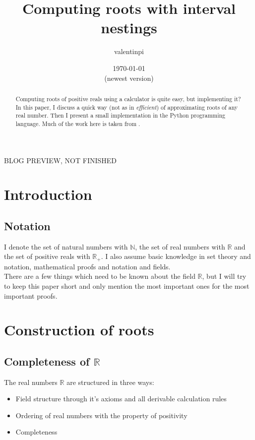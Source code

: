 \documentclass[a4paper, 10pt]{article}
\theoremstyle{remark}
\theoremstyle{definition}
\begin{document}
    \title{
        \vspace{-5ex}
        \large Computing roots with interval nestings
    }
    \author{
        \normalsize valentinpi
    }
    \date{
        \normalsize \today\\
        (newest version)
    }
    \maketitle

    \begin{abstract}
        Computing roots of positive reals using a calculator is quite easy, but implementing it? In this paper, I discuss a quick way (not as in \emph{efficient}) of approximating roots of any real number. Then I present a small implementation in the Python programming language. Much of the work here is taken from \cite{analysiskoenigsberger}.
    \end{abstract}

    \begin{center}
        \huge
        BLOG PREVIEW, NOT FINISHED
    \end{center}
    
    \tableofcontents

    \section{Introduction}
    
    \subsection{Notation}
    
    I denote the set of natural numbers with \(\mathbb{N}\), the set of real numbers with \(\mathbb{R}\) and the set of positive reals with \(\mathbb{R}_+\). I also assume basic knowledge in set theory and notation, mathematical proofs and notation and fields.\\

    There are a few things which need to be known about the field \(\mathbb{R}\), but I will try to keep this paper short and only mention the most important ones for the most important proofs.
    
    \section{Construction of roots}
    
    \subsection{Completeness of \texorpdfstring{\(\mathbb{R}\)}{R}}
    The real numbers \(\mathbb{R}\) are structured in three ways:
    \begin{itemize}
        \item Field structure through it's axioms and all derivable calculation rules
        \item Ordering of real numbers with the property of positivity
        \item Completeness
    \end{itemize}
    
\end{document}
